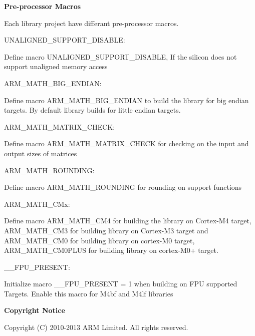 {\bfseries Pre-\/processor Macros}

Each library project have differant pre-\/processor macros.


\begin{DoxyItemize}
\item U\+N\+A\+L\+I\+G\+N\+E\+D\+\_\+\+S\+U\+P\+P\+O\+R\+T\+\_\+\+D\+I\+S\+A\+B\+LE\+:
\end{DoxyItemize}

Define macro U\+N\+A\+L\+I\+G\+N\+E\+D\+\_\+\+S\+U\+P\+P\+O\+R\+T\+\_\+\+D\+I\+S\+A\+B\+LE, If the silicon does not support unaligned memory access


\begin{DoxyItemize}
\item A\+R\+M\+\_\+\+M\+A\+T\+H\+\_\+\+B\+I\+G\+\_\+\+E\+N\+D\+I\+AN\+:
\end{DoxyItemize}

Define macro A\+R\+M\+\_\+\+M\+A\+T\+H\+\_\+\+B\+I\+G\+\_\+\+E\+N\+D\+I\+AN to build the library for big endian targets. By default library builds for little endian targets.


\begin{DoxyItemize}
\item A\+R\+M\+\_\+\+M\+A\+T\+H\+\_\+\+M\+A\+T\+R\+I\+X\+\_\+\+C\+H\+E\+CK\+:
\end{DoxyItemize}

Define macro A\+R\+M\+\_\+\+M\+A\+T\+H\+\_\+\+M\+A\+T\+R\+I\+X\+\_\+\+C\+H\+E\+CK for checking on the input and output sizes of matrices


\begin{DoxyItemize}
\item A\+R\+M\+\_\+\+M\+A\+T\+H\+\_\+\+R\+O\+U\+N\+D\+I\+NG\+:
\end{DoxyItemize}

Define macro A\+R\+M\+\_\+\+M\+A\+T\+H\+\_\+\+R\+O\+U\+N\+D\+I\+NG for rounding on support functions


\begin{DoxyItemize}
\item A\+R\+M\+\_\+\+M\+A\+T\+H\+\_\+\+C\+Mx\+:
\end{DoxyItemize}

Define macro A\+R\+M\+\_\+\+M\+A\+T\+H\+\_\+\+C\+M4 for building the library on Cortex-\/\+M4 target, A\+R\+M\+\_\+\+M\+A\+T\+H\+\_\+\+C\+M3 for building library on Cortex-\/\+M3 target and A\+R\+M\+\_\+\+M\+A\+T\+H\+\_\+\+C\+M0 for building library on cortex-\/\+M0 target, A\+R\+M\+\_\+\+M\+A\+T\+H\+\_\+\+C\+M0\+P\+L\+US for building library on cortex-\/\+M0+ target.


\begin{DoxyItemize}
\item \+\_\+\+\_\+\+F\+P\+U\+\_\+\+P\+R\+E\+S\+E\+NT\+:
\end{DoxyItemize}

Initialize macro \+\_\+\+\_\+\+F\+P\+U\+\_\+\+P\+R\+E\+S\+E\+NT = 1 when building on F\+PU supported Targets. Enable this macro for M4bf and M4lf libraries

{\bfseries Copyright Notice}

Copyright (C) 2010-\/2013 A\+RM Limited. All rights reserved. 